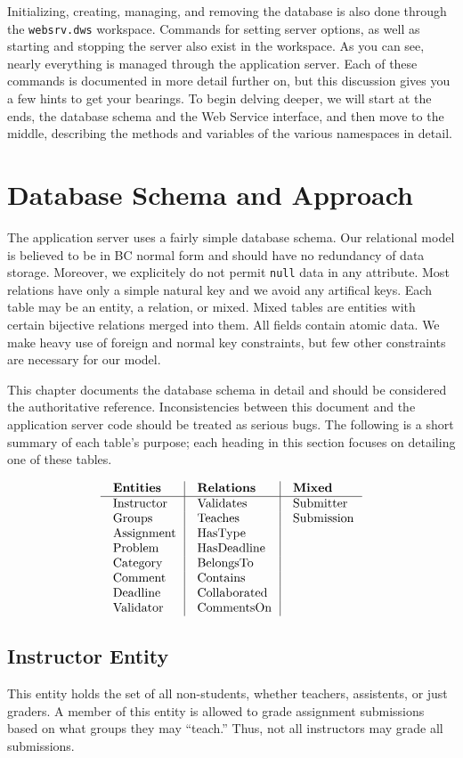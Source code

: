 Initializing, creating, managing, and removing the database is also done through
the {\tt websrv.dws} workspace.  Commands for setting server options, as well as
starting and stopping the server also exist in the workspace.  As you can see, 
nearly everything is managed through the application server.  Each of these 
commands is documented in more detail further on, but this discussion gives you 
a few hints to get your bearings.
To begin delving deeper, we will start at the ends, the database schema and 
the Web Service interface, and then move to the middle, describing the methods 
and variables of the various namespaces in detail.

\section{Database Schema and Approach}

\noindent
The application server uses a fairly simple database schema.
Our relational model is believed to be in BC normal form and 
should have no redundancy of data storage.
Moreover, we explicitely do not permit {\tt null} data in any attribute.
Most relations have only a simple natural key and we avoid any 
artifical keys. Each table may be an entity, a relation, or mixed. 
Mixed tables are entities with certain bijective relations merged into them.
All fields contain atomic data.
We make heavy use of foreign and normal key constraints, 
but few other constraints are necessary for our model.

This chapter documents the database schema in detail and should be 
considered the authoritative reference. 
Inconsistencies between this document and the application server code should be 
treated as serious bugs. The following is a short summary of each table's 
purpose; each heading in this section focuses on detailing one of these tables.

$$\vbox{
  \offinterlineskip
  \halign{
    \strut \quad #  & \vrule\quad #  & \vrule\quad # \cr
    {\bf Entities}  & {\bf Relations}  & {\bf Mixed}\cr
    \noalign{\hrule}    
    Instructor  & Validates  & Submitter \cr
    Groups  & Teaches  & Submission \cr
    Assignment  & HasType  & \cr
    Problem  & HasDeadline  & \cr
    Category & BelongsTo  & \cr
    Comment & Contains  & \cr
    Deadline & Collaborated  & \cr
    Validator & CommentsOn  & \cr
  }
}$$

\subsection{Instructor Entity}
This entity holds the set of all non-students, 
whether teachers, assistents, or just graders.
A member of this entity is allowed to grade assignment submissions
based on what groups they may ``teach.''
Thus, not all instructors may grade all submissions.

